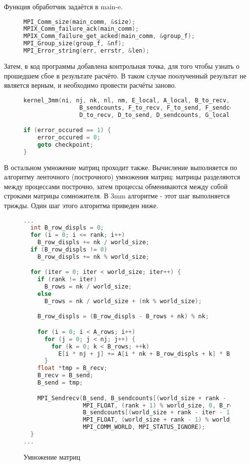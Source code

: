 \documentclass[12pt, oneside, a4paper]{article}
\begin{document}
Функция обработчик задаётся в main-e.

\begin{figure}[h]
\begin{lstlisting}[language=C++]
MPI_Comm_size(main_comm, &size);
MPIX_Comm_failure_ack(main_comm);
MPIX_Comm_failure_get_acked(main_comm, &group_f);
MPI_Group_size(group_f, &nf);
MPI_Error_string(err, errstr, &len);
\end{lstlisting}
\end{figure}

Затем, в код программы добавлена контрольная точка, для того чтобы узнать о прошедшем сбое в результате расчёто. В таком случае поолученный результат не является верным, и необходимо провести расчёты заново.

\begin{figure}[h]
\begin{lstlisting}[language=C++]
kernel_3mm(ni, nj, nk, nl, nm, E_local, A_local, B_to_recv, B_to_send,
                B_sendcounts, F_to_recv, F_to_send, F_sendcounts, C_local,
                D_to_recv, D_to_send, D_sendcounts, G_local);

if (error_occured == 1) {
	error_occured = 0;
	goto checkpoint;
}
\end{lstlisting}
\end{figure}



В остальном умножение матриц проходит также. Вычисление выполняется по алгоритму ленточного (построчного) умножения матриц: матрицы разделяются между процессами построчно, затем процессы обмениваются между собой строками матрицы сомножителя. В 3mm алгоритме - этот шаг выполняется трижды. Один шаг этого алгоритма приведен ниже.

\vspace{600pt}

\begin{figure}[h]
\begin{lstlisting}[language=C++]
...
  int B_row_displs = 0;
  for (i = 0; i <= rank; i++)
    B_row_displs += nk / world_size;
  if (B_row_displs != 0)
    B_row_displs += nk % world_size;

  for (iter = 0; iter < world_size; iter++) {
    if (rank != iter)
      B_rows = nk / world_size;
    else
      B_rows = nk / world_size + (nk % world_size);

    B_row_displs = (B_row_displs - B_rows + nk) % nk;

    for (i = 0; i < A_rows; i++)
      for (j = 0; j < nj; j++) {
        for (k = 0; k < B_rows; ++k)
          E[i * nj + j] += A[i * nk + B_row_displs + k] * B_recv[k * nj + j];
      }
    float *tmp = B_recv;
    B_recv = B_send;
    B_send = tmp;

    MPI_Sendrecv(B_send, B_sendcounts[(world_size + rank - iter) % world_size],
                 MPI_FLOAT, (rank + 1) % world_size, 0, B_recv,
                 B_sendcounts[(world_size + rank - iter - 1) % world_size],
                 MPI_FLOAT, (world_size + rank - 1) % world_size, 0,
                 MPI_COMM_WORLD, MPI_STATUS_IGNORE);
  }
...
\end{lstlisting}
\caption{Умножение матриц}
\end{figure}
\end{document}
